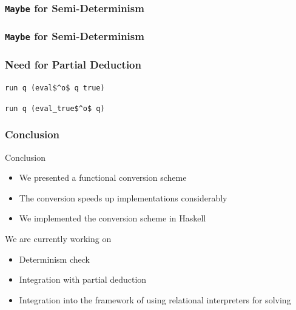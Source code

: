 \documentclass[xcolor=table, aspectratio=169]{beamer}
\begin{document}
\begin{frame}[fragile]
  \frametitle{\lstinline[basicstyle=\Large]{Maybe} for Semi-Determinism}
\begin{center}
  \begin{minipage}{0.43\textwidth}
    
  \end{minipage}
\end{center}
\end{frame}


\begin{frame}[noframenumbering]
  \frametitle{\lstinline[basicstyle=\Large]{Maybe} for Semi-Determinism}
  \begin{center}
  \begin{minipage}{0.43\textwidth}
    
  \end{minipage}
\end{center}
\end{frame}

\begin{frame}[fragile]
  \frametitle{Need for Partial Deduction}

\begin{center}
\begin{minipage}{0.3\textwidth}
  \lstinline{run q (eval$^o$ q true)}

  \vspace{0.5cm}

  \lstinline{run q (eval_true$^o$ q)}
\end{minipage}


\end{center}


\end{frame}

\begin{frame}[fragile]
  \frametitle{Conclusion}
Conclusion
  \begin{itemize}
    \item We presented a functional conversion scheme
    \item The conversion speeds up implementations considerably
    \item We implemented the conversion scheme in Haskell
  \end{itemize}

\vfill

We are currently working on
  \begin{itemize}
    \item Determinism check
    \item Integration with partial deduction
    \item Integration into the framework of using relational interpreters for solving
  \end{itemize}
\end{frame}
\end{document}
